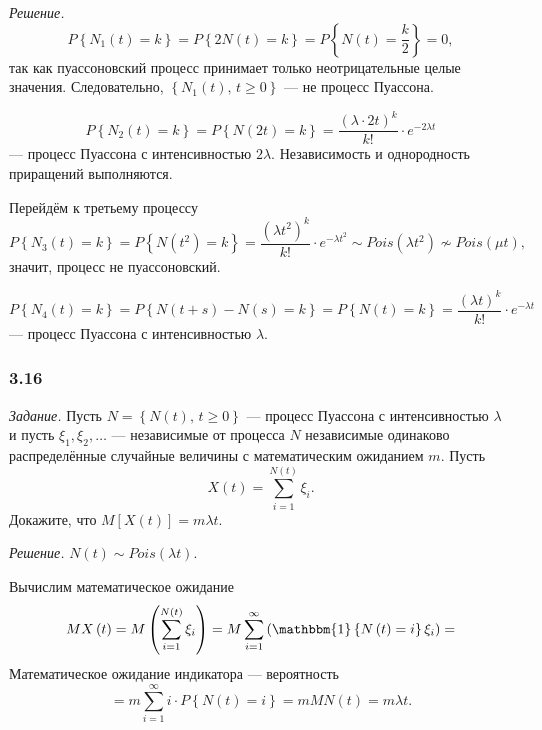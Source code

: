 \textit{Решение.}
$$P \left\{ N_1 \left( t \right) = k \right\} =
  P \left\{ 2N \left( t \right) = k \right\} =
  P \left\{ N \left( t \right) = \frac{k}{2} \right\} =
  0,$$
так как пуассоновский процесс принимает только неотрицательные целые значения.
Следовательно, $ \left\{ N_1 \left( t \right), \, t \geq 0 \right\} $ --- не процесс Пуассона.

$$P \left\{ N_2 \left( t \right) = k \right\} =
  P \left\{ N \left( 2t \right) = k \right\} =
  \frac{ \left( \lambda \cdot 2t \right)^k}{k!} \cdot e^{-2 \lambda t}$$
--- процесс Пуассона с интенсивностью $2 \lambda $.
Независимость и однородность приращений выполняются.


Перейдём к третьему процессу
$$P \left\{ N_3 \left( t \right) = k \right\} =
  P \left\{ N \left( t^2 \right) = k \right\} =
  \frac{ \left( \lambda t^2 \right)^k}{k!} \cdot e^{-\lambda t^2} \sim
  Pois \left( \lambda t^2 \right) \not \sim
  Pois \left( \mu t \right),$$
значит, процесс не пуассоновский.

$$P \left\{ N_4 \left( t \right) = k \right\} =
  P \left\{ N \left( t + s \right) - N \left( s \right) = k \right\} =
  P \left\{ N \left( t \right) = k \right\} =
  \frac{ \left( \lambda t \right)^k}{k!} \cdot e^{-\lambda t}$$
--- процесс Пуассона с интенсивностью $ \lambda $.

\subsubsection*{3.16}

\textit{Задание.}
Пусть $N = \left\{ N \left( t \right), \, t \geq 0 \right\} $ ---
процесс Пуассона с интенсивностью $ \lambda $ и пусть $ \xi_1, \xi_2, \dotsc $ ---
независимые от процесса $N$
независимые одинаково распределённые случайные величины с математическим ожиданием $m$.
Пусть
$$X \left( t \right) =
  \sum \limits_{i = 1}^{N \left( t \right) } \xi_i.$$
Докажите, что $M \left[ X \left( t \right) \right] = m \lambda t$.

\textit{Решение.}
$N \left( t \right) \sim Pois \left( \lambda t \right) $.

Вычислим математическое ожидание
$$MX \left( t \right) =
  M \left( \sum \limits_{i = 1}^{N \left( t \right) } \xi_i \right) =
  M \sum \limits_{i = 1}^{ \infty }
    \left( \mathbbm{1} \left\{ N \left( t \right) = i \right\} \xi_i \right) =$$
Математическое ожидание индикатора --- вероятность
$$= m \sum \limits_{i = 1}^{ \infty } i \cdot P \left\{ N \left( t \right) = i \right\} =
  mMN \left( t \right) =
  m \lambda t.$$


